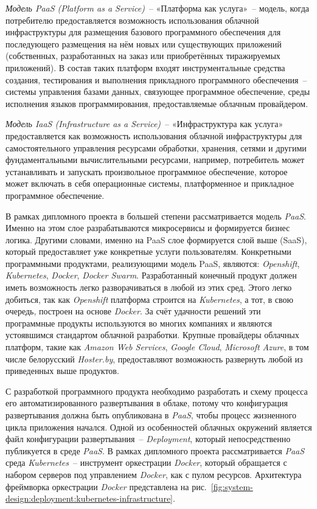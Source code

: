 \textit{Модель PaaS (Platform as a Service)}~-- «Платформа как услуга»~-- модель, когда потребителю предоставляется возможность использования облачной инфраструктуры для размещения базового программного обеспечения для последующего размещения на нём новых или существующих приложений (собственных, разработанных на заказ или приобретённых тиражируемых приложений). В состав таких платформ входят инструментальные средства создания, тестирования и выполнения прикладного программного обеспечения~-- системы управления базами данных, связующее программное обеспечение, среды исполнения языков программирования, предоставляемые облачным провайдером.

\textit{Модель IaaS (Infrastructure as a Service)}~-- «Инфраструктура как услуга» пре\-дос\-та\-вля\-ется как возможность использования облачной инфраструктуры для самостоятельного управления ресурсами обработки, хранения, сетями и другими фундаментальными вычислительными ресурсами, например, потребитель может устанавливать и запускать произвольное программное обеспечение, которое может включать в себя операционные системы, платформенное и прикладное программное обеспечение.

В рамках дипломного проекта в большей степени рассматривается модель \textit{PaaS}. Именно на этом слое разрабатываются микросервисы и формируется бизнес логика. Другими словами, именно на PaaS слое формируется слой выше (SaaS), который предоставляет уже конкретные услуги пользователям. Конкретными программными продуктами, реализующими модель PaaS, являются: \textit{Openshift}, \textit{Kubernetes}, \textit{Docker}, \textit{Docker Swarm}. Разработанный конечный продукт должен иметь возможность легко разворачиваться в любой из этих сред. Этого легко добиться, так как \textit{Openshift} платформа строится на \textit{Kubernetes}, а тот, в свою очередь, построен на основе \textit{Docker}. За счёт удачности решений эти программные продукты используются во многих компаниях и являются устоявшимся стандартом облачной разработки. Крупные провайдеры облачных платформ, такие как \textit{Amazon Web Services}, \textit{Google Cloud}, \textit{Microsoft Azure}, в том числе белорусский \textit{Hoster.by}, предоставляют возможность развернуть любой из приведенных выше продуктов.

С разработкой программного продукта необходимо разработать и схему процесса его автоматизированного развертывания в облаке, потому что конфигурация развертывания должна быть опубликована в \textit{PaaS}, чтобы процесс жизненного цикла приложения начался. Одной из особенностей облачных окружений является файл конфигурации развертывания~-- \textit{Deployment}, который непосредственно публикуется в среде \textit{PaaS}. В рамках дипломного проекта рассматривается \textit{PaaS} среда \textit{Kubernetes}~-- инструмент оркестрации \textit{Docker}, который обращается с набором серверов под управлением \textit{Docker}, как с пулом ресурсов. Архитектура фреймворка оркестрации \textit{Docker} представлена на рис.~\ref{fig:system-design:deployment:kubernetes-infrastructure}.

